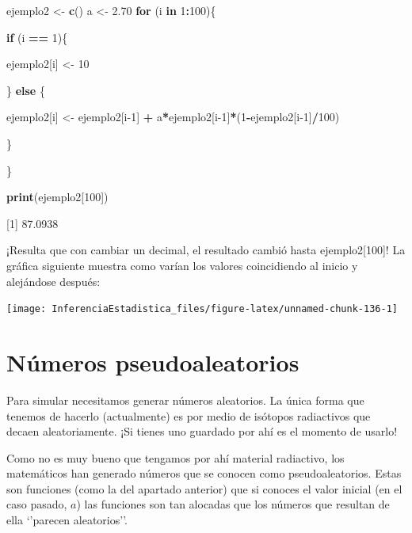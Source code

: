 \documentclass[
]{book}
\newenvironment{Shaded}{\begin{snugshade}}{\end{snugshade}}
\newcommand{\ControlFlowTok}[1]{\textcolor[rgb]{0.13,0.29,0.53}{\textbf{#1}}}
\newcommand{\DecValTok}[1]{\textcolor[rgb]{0.00,0.00,0.81}{#1}}
\newcommand{\FloatTok}[1]{\textcolor[rgb]{0.00,0.00,0.81}{#1}}
\newcommand{\KeywordTok}[1]{\textcolor[rgb]{0.13,0.29,0.53}{\textbf{#1}}}
\newcommand{\NormalTok}[1]{#1}
\newcommand{\OperatorTok}[1]{\textcolor[rgb]{0.81,0.36,0.00}{\textbf{#1}}}
\newcommand{\StringTok}[1]{\textcolor[rgb]{0.31,0.60,0.02}{#1}}
\begin{document}
\begin{Shaded}
\begin{Highlighting}[]
\NormalTok{ejemplo2 <-}\StringTok{ }\KeywordTok{c}\NormalTok{()}
\NormalTok{a       <-}\StringTok{ }\FloatTok{2.70}
\ControlFlowTok{for}\NormalTok{ (i }\ControlFlowTok{in} \DecValTok{1}\OperatorTok{:}\DecValTok{100}\NormalTok{)\{}
  
  \ControlFlowTok{if}\NormalTok{ (i }\OperatorTok{==}\StringTok{ }\DecValTok{1}\NormalTok{)\{}
    
\NormalTok{    ejemplo2[i] <-}\StringTok{ }\DecValTok{10}
    
\NormalTok{  \} }\ControlFlowTok{else}\NormalTok{ \{}
    
\NormalTok{    ejemplo2[i] <-}\StringTok{ }\NormalTok{ejemplo2[i}\DecValTok{-1}\NormalTok{] }\OperatorTok{+}\StringTok{ }
\StringTok{                   }\NormalTok{a}\OperatorTok{*}\NormalTok{ejemplo2[i}\DecValTok{-1}\NormalTok{]}\OperatorTok{*}\NormalTok{(}\DecValTok{1}\OperatorTok{-}\NormalTok{ejemplo2[i}\DecValTok{-1}\NormalTok{]}\OperatorTok{/}\DecValTok{100}\NormalTok{)}
    
\NormalTok{  \}}
  
\NormalTok{\}}
 
\KeywordTok{print}\NormalTok{(ejemplo2[}\DecValTok{100}\NormalTok{])}
\end{Highlighting}
\end{Shaded}

{[}1{]} 87.0938

¡Resulta que con cambiar un decimal, el resultado cambió hasta ejemplo2{[}100{]}!
La gráfica siguiente muestra como varían los valores coincidiendo al inicio y alejándose después:

\begin{center}\texttt{[image: InferenciaEstadistica\_files/figure-latex/unnamed-chunk-136-1]} \end{center}

\hypertarget{nuxfameros-pseudoaleatorios}{%
\section{Números pseudoaleatorios}\label{nuxfameros-pseudoaleatorios}}

Para simular necesitamos generar números aleatorios. La única forma que tenemos de hacerlo (actualmente) es por medio de isótopos radiactivos que decaen aleatoriamente. ¡Si tienes uno guardado por ahí es el momento de usarlo!

Como no es muy bueno que tengamos por ahí material radiactivo, los matemáticos han generado números que se conocen como pseudoaleatorios. Estas son funciones (como la del apartado anterior) que si conoces el valor inicial (en el caso pasado, \(a\)) las funciones son tan alocadas que los números que resultan de ella `'parecen aleatorios''.
\end{document}
